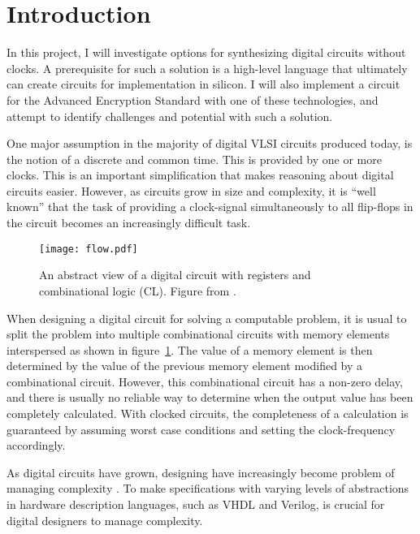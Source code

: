 \section{Introduction}

In this project, I will investigate options for synthesizing digital
circuits without clocks. A prerequisite for such a solution is a
high-level language that ultimately can create circuits for
implementation in silicon. I will also implement a circuit for the
 Advanced Encryption
Standard with one of these technologies, and attempt to identify
challenges and potential with such a solution.

One major assumption in the majority of digital
 VLSI circuits
produced today, is the notion of a discrete and common time. This is
provided by one or more clocks. This is an important simplification
that makes reasoning about digital circuits easier. However, as
circuits grow in size and complexity, it is ``well known''
\cite[pp. 5]{sparso} that the task of providing a clock-signal
simultaneously to all flip-flops in the circuit becomes an
increasingly difficult task.

\begin{figure}[htbp]
  \centering
  \texttt{[image: flow.pdf]}
  \caption{An abstract view of a digital circuit with registers and
    combinational logic (CL). Figure from \cite{sparso}.}
  \label{fig:flow}
\end{figure}

When designing a digital circuit for solving a computable problem, it
is usual to split the problem into multiple combinational circuits
with memory elements interspersed as shown in
figure~\ref{fig:flow}. The value of a memory element is then
determined by the value of the previous memory element modified by a
combinational circuit. However, this combinational circuit has a
non-zero delay, and there is usually no reliable way to determine when
the output value has been completely calculated. With clocked
circuits, the completeness of a calculation is guaranteed by assuming
worst case conditions and setting the clock-frequency accordingly.

As digital circuits have grown, designing have increasingly become
problem of managing complexity \cite{flynn2009deep}. To make
specifications with varying levels of abstractions in hardware
description languages, such as VHDL and Verilog, is crucial for
digital designers to manage complexity.

